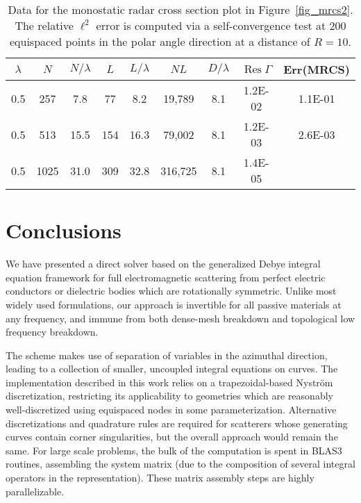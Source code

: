 \documentclass[11pt]{article}
\DeclareMathOperator{\Res}{Res}
\numberwithin{equation}{section}
\begin{document}
\begin{table}[!b]
  \begin{center}
    \caption{Data for the monostatic radar cross section plot in
      Figure~\ref{fig_mrcs2}. The relative $\ell^2$ error is computed via a
      self-convergence test at 200 equispaced
      points in the polar angle direction at a distance of $R=10$.}
    \label{tab_rcs}
      \begin{tabular}{|c|c|c|c|c|c|c|c|c|} \hline
        $\lambda$ & $N$  & $N/\lambda$ & $L$ & $L/\lambda$ & $NL$
        & $D/\lambda$ & $\Res\Gamma$
        & Err(MRCS) \\ \hline\hline
        0.5 & 257 & 7.8 & 77 & 8.2  & 19,789 & 8.1
                      & 1.2E-02 &  1.1E-01  \\ \hline
        0.5 &  513 & 15.5 & 154 & 16.3  & 79,002 & 8.1 
                      & 1.2E-03  & 2.6E-03  \\ \hline
        0.5 & 1025  & 31.0 & 309 & 32.8  & 316,725 & 8.1
                      & 1.4E-05 &   \\ \hline
      \end{tabular}
  \end{center}
\end{table}


\section{Conclusions}
\label{sec_conclusions}

We have presented a direct solver based on the generalized Debye
integral equation framework for full electromagnetic scattering from
perfect electric conductors or dielectric bodies which are rotationally
symmetric. Unlike most widely used formulations, our approach
is invertible for all passive materials at any frequency, and 
immune from both dense-mesh breakdown and topological low frequency
breakdown.

The scheme makes use of separation of variables
in the azimuthal direction, leading to a collection of smaller,
uncoupled integral equations on curves.
The implementation described in this work relies on a trapezoidal-based
Nystr\"om discretization, restricting its applicability to
geometries which are reasonably well-discretized using equispaced
nodes in some parameterization. Alternative discretizations and quadrature
rules are required for scatterers
whose generating curves contain corner singularities, but the overall approach
would remain the same.
For large scale problems, the bulk of the
computation is spent in BLAS3 routines, assembling the system matrix
(due to the composition of several integral operators in the representation).
These matrix assembly steps are highly parallelizable.  
\end{document}
